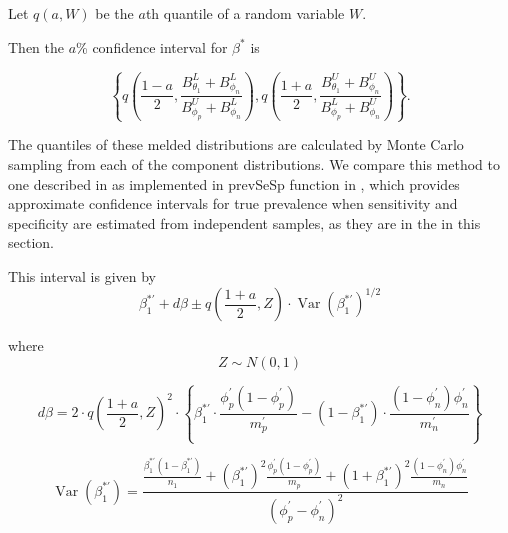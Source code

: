\documentclass[AMA,STIX1COL]{WileyNJD-v2}
\DeclareMathOperator{\Var}{Var}
\begin{document}
Let \( q(a, W) \) be the \( a \)th quantile of a random variable \( W \).

Then the \( a \)\% confidence interval for \( \beta^* \) is 

\begin{equation}
    \left\{ q \left( \frac{1 - a}{2}, \frac{B_{\theta_1}^L + B_{\phi_n}^L }{B_{\phi_p}^U + B_{\phi_n}^L }  \right),  q \left( \frac{1 + a}{2}, \frac{B_{\theta_1}^U + B_{\phi_n}^U}{B_{\phi_p}^L + B_{\phi_n}^U}  \right) \right\}.
\label{eq:srs-conf-int}
\end{equation}



The quantiles of these melded distributions are calculated by Monte Carlo sampling from each of the component distributions.
We compare this method to one described in \cite{Lang:2014} as implemented in prevSeSp function in \cite{asht}, which provides approximate confidence intervals for true prevalence when sensitivity and specificity are estimated from independent samples, as they are in the in this section.

This interval is given by
\begin{equation}
\beta_1^{*\prime} + d\beta \pm q\left( \frac{1 + a}{2}, Z \right) \cdot \Var(\beta_1^{*\prime})^{1/2}    
\end{equation}

where
\begin{equation}
   Z \sim N(0,1) 
\end{equation}

\begin{equation}
    d\beta = 2 \cdot q\left( \frac{1 + a}{2}, Z \right)^2 \cdot\left\{ \beta_1^{*\prime} \cdot \frac{\phi_p^\prime (1 - \phi_p^\prime)}{m_p^\prime} - (1 - \beta_1^{*\prime}) \cdot \frac{(1 - \phi_n^\prime) \phi_n^\prime}{m_n^\prime}  \right\}
\end{equation}

\begin{equation}
    \Var(\beta_1^{*\prime}) = \frac{ \frac{\beta_1^{*\prime}(1 - \beta_1^{*\prime})}{n_1} + \left(\beta_1^{*\prime}\right)^2 \frac{\phi_p^\prime (1 - \phi_p^\prime)}{m_p} + \left(1 + \beta_1^{*\prime}\right)^2 \frac{(1 - \phi_n^\prime) \phi_n^\prime}{ m_n}}{(\phi_p^\prime - \phi_n^\prime)^2}
\end{equation}
\end{document}
